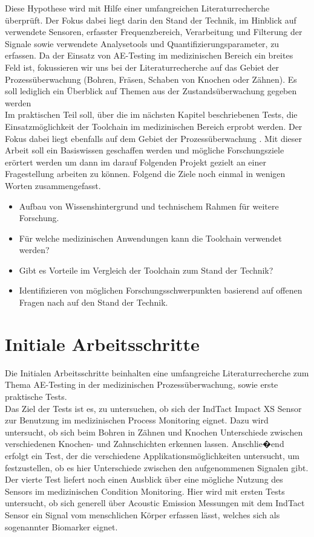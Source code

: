 \documentclass[twoside, 12pt, a4paper]{article}
\begin{document}
	Diese Hypothese wird mit Hilfe einer umfangreichen Literaturrecherche \"uberpr\"uft. Der Fokus dabei liegt darin den Stand der Technik, im Hinblick auf verwendete Sensoren, erfasster Frequenzbereich, Verarbeitung und Filterung der Signale sowie verwendete Analysetools und Quantifizierungsparameter, zu erfassen. Da der Einsatz von AE-Testing im medizinischen Bereich ein breites Feld ist, fokussieren wir uns bei der Literaturrecherche auf das Gebiet der Prozess\"uberwachung (Bohren, Fr\"asen, Schaben von Knochen oder Z\"ahnen). Es soll lediglich ein \"Uberblick auf Themen aus der Zustands\"uberwachung gegeben werden \\    
	Im praktischen Teil soll, \"uber die im n\"achsten Kapitel beschriebenen Tests, die Einsatzm\"oglichkeit der Toolchain im medizinischen Bereich erprobt werden. Der Fokus dabei liegt ebenfalls auf dem Gebiet der Prozess\"uberwachung . 
	Mit dieser Arbeit soll ein Basiswissen geschaffen werden und m\"ogliche Forschungsziele er\"ortert werden um dann im darauf Folgenden Projekt gezielt an einer Fragestellung arbeiten zu k\"onnen. Folgend die Ziele noch einmal in wenigen Worten zusammengefasst.
	
	\begin{itemize}
		\item {Aufbau von Wissenshintergrund und technischem Rahmen f\"ur	weitere Forschung.}
		\item {F\"ur welche medizinischen Anwendungen kann die Toolchain verwendet werden?} 
		\item {Gibt es Vorteile im Vergleich der Toolchain zum Stand der Technik?} 
		\item {Identifizieren von m\"oglichen Forschungsschwerpunkten basierend auf offenen Fragen nach auf den Stand der Technik.}
	\end{itemize} 
	
	 
	
	
	
	\section{Initiale Arbeitsschritte}
	
Die Initialen Arbeitsschritte beinhalten eine umfangreiche Literaturrecherche zum Thema AE-Testing in der medizinischen Prozess\"uberwachung, sowie erste praktische Tests. \\


Das Ziel der Tests ist es, zu untersuchen, ob sich der IndTact Impact XS Sensor zur Benutzung im medizinischen Process Monitoring eignet. Dazu wird untersucht, ob sich beim Bohren in Z\"ahnen und Knochen Unterschiede zwischen verschiedenen Knochen- und Zahnschichten erkennen lassen. Anschlie�end erfolgt ein Test, der die verschiedene Applikationsm\"oglichkeiten untersucht, um festzustellen, ob es hier Unterschiede zwischen den aufgenommenen Signalen gibt. Der vierte Test liefert noch einen Ausblick \"uber eine m\"ogliche Nutzung des Sensors im medizinischen Condition Monitoring. Hier wird mit ersten Tests untersucht, ob sich generell \"uber Acoustic Emission Messungen mit dem IndTact Sensor ein Signal vom menschlichen K\"orper erfassen l\"asst, welches sich als sogenannter Biomarker eignet.  
\end{document}
